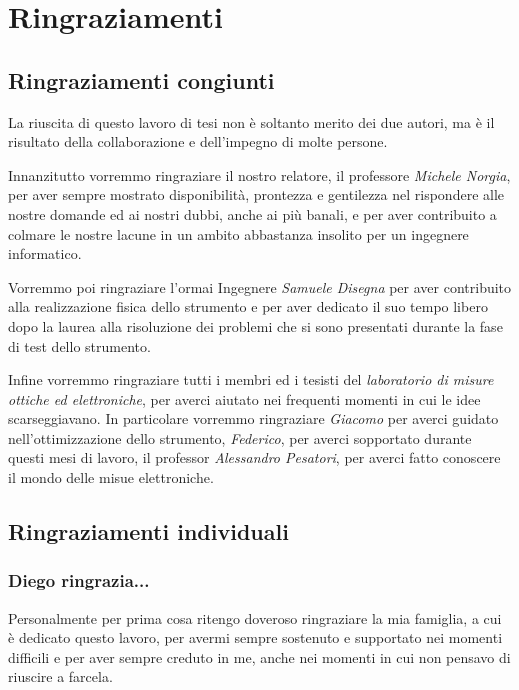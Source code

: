 \chapter*{Ringraziamenti}
\label{ringraziamenti}
\thispagestyle{empty}

\section*{Ringraziamenti congiunti}
La riuscita di questo lavoro di tesi non è soltanto merito dei due autori, ma è il risultato della collaborazione e dell'impegno di molte persone.

Innanzitutto vorremmo ringraziare il nostro relatore, il professore \textit{Michele Norgia}, per aver sempre mostrato disponibilità, prontezza e gentilezza nel rispondere alle nostre domande ed ai nostri dubbi, anche ai più banali, e per aver contribuito a colmare le nostre lacune in un ambito abbastanza insolito per un ingegnere informatico.

Vorremmo poi ringraziare l'ormai Ingegnere \textit{Samuele Disegna} per aver contribuito alla realizzazione fisica dello strumento e per aver dedicato il suo tempo libero dopo la laurea alla risoluzione dei problemi che si sono presentati durante la fase di test dello strumento.

Infine vorremmo ringraziare tutti i membri ed i tesisti del \textit{laboratorio di misure ottiche ed elettroniche}, per averci aiutato nei frequenti momenti in cui le idee scarseggiavano. In particolare vorremmo ringraziare \textit{Giacomo} per averci guidato nell'ottimizzazione dello strumento, \textit{Federico}, per averci sopportato durante questi mesi di lavoro, il professor \textit{Alessandro Pesatori}, per averci fatto conoscere il mondo delle misue elettroniche.

\section*{Ringraziamenti individuali}
\subsection*{Diego ringrazia...}

Personalmente per prima cosa ritengo doveroso ringraziare la mia famiglia, a cui è dedicato questo lavoro, per avermi sempre sostenuto e supportato nei momenti difficili e per aver sempre creduto in me, anche nei momenti in cui non pensavo di riuscire a farcela.

